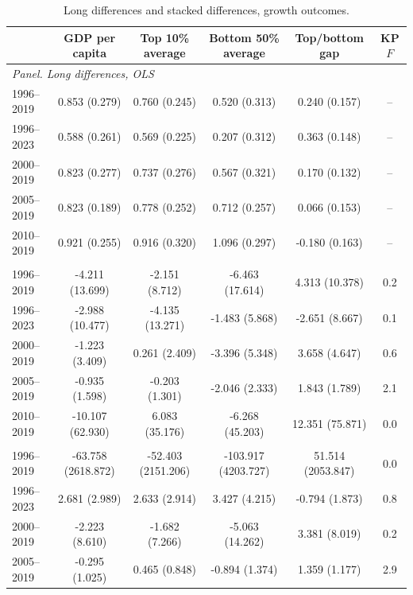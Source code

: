 \begin{table}[H]\centering\caption{Long differences and stacked differences, growth outcomes.}\label{tab:a_growth_ld}
\begin{threeparttable}\small\begin{tabular}{lccccc}
\toprule
 & GDP per capita & Top 10\% average & Bottom 50\% average & Top/bottom gap & KP $F$ \\
\midrule
\multicolumn{6}{l}{\emph{Panel. Long differences, OLS}}\\
1996--2019 & 0.853\sym{***} (0.279) & 0.760\sym{***} (0.245) & 0.520 (0.313) & 0.240 (0.157) & -- \\
1996--2023 & 0.588\sym{**} (0.261) & 0.569\sym{**} (0.225) & 0.207 (0.312) & 0.363\sym{**} (0.148) & -- \\
2000--2019 & 0.823\sym{***} (0.277) & 0.737\sym{***} (0.276) & 0.567\sym{*} (0.321) & 0.170 (0.132) & -- \\
2005--2019 & 0.823\sym{***} (0.189) & 0.778\sym{***} (0.252) & 0.712\sym{***} (0.257) & 0.066 (0.153) & -- \\
2010--2019 & 0.921\sym{***} (0.255) & 0.916\sym{***} (0.320) & 1.096\sym{***} (0.297) & -0.180 (0.163) & -- \\
\addlinespace
\multicolumn{6}{l}{\emph{Panel. Long differences, 2SLS, Feyrer}}\\
1996--2019 & -4.211 (13.699) & -2.151 (8.712) & -6.463 (17.614) & 4.313 (10.378) & 0.2 \\
1996--2023 & -2.988 (10.477) & -4.135 (13.271) & -1.483 (5.868) & -2.651 (8.667) & 0.1 \\
2000--2019 & -1.223 (3.409) & 0.261 (2.409) & -3.396 (5.348) & 3.658 (4.647) & 0.6 \\
2005--2019 & -0.935 (1.598) & -0.203 (1.301) & -2.046 (2.333) & 1.843 (1.789) & 2.1 \\
2010--2019 & -10.107 (62.930) & 6.083 (35.176) & -6.268 (45.203) & 12.351 (75.871) & 0.0 \\
\addlinespace
\multicolumn{6}{l}{\emph{Panel. Long differences, 2SLS, tourism}}\\
1996--2019 & -63.758 (2618.872) & -52.403 (2151.206) & -103.917 (4203.727) & 51.514 (2053.847) & 0.0 \\
1996--2023 & 2.681 (2.989) & 2.633 (2.914) & 3.427 (4.215) & -0.794 (1.873) & 0.8 \\
2000--2019 & -2.223 (8.610) & -1.682 (7.266) & -5.063 (14.262) & 3.381 (8.019) & 0.2 \\
2005--2019 & -0.295 (1.025) & 0.465 (0.848) & -0.894 (1.374) & 1.359 (1.177) & 2.9 \\

\end{tabular}
\end{threeparttable}
\end{table}
